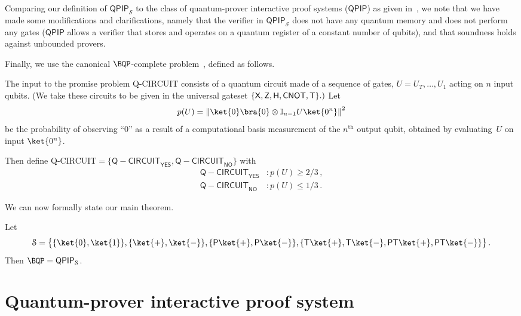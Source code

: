 \documentclass{toc}
\newcommand{\hgate}{{\sf H}}
\newcommand{\pgate}{{\sf P}}
\newcommand{\tgate}{{\sf T}}
\newcommand{\xgate}{{\sf X}}
\newcommand{\zgate}{{\sf Z}}
\newcommand{\cnot}{{\sf CNOT}}
\newcommand{\QPIP}{\mathsf{QPIP}}
\newcommand{\calS}{\mathcal{S}}
\newcommand{\norm}[1]{\left\lVert#1\right\rVert}					%
\begin{document}
Comparing our definition of $\QPIP_\calS$ to the class of quantum-prover interactive proof systems ($\QPIP$) as given in~\cite{ABE10}, we note that we have made some modifications and clarifications, namely that the verifier in $\QPIP_\calS$ does not have any quantum memory and does not perform any gates ($\QPIP$ allows a verifier that stores and operates on a quantum register of a constant number of qubits), and that soundness holds against unbounded provers.




Finally, we use the %
%
%
%
canonical $\BQP$-complete problem~\cite{ABE10},  %
defined as follows.    %
\begin{definition} \label{defn-Q-circuit}
%
%
The input to the promise problem \textsf{Q-CIRCUIT} consists 
of a quantum circuit made of a sequence of gates, $U= U_T, \ldots, U_1$ acting on $n$ input
%
%
qubits.  (We take
these circuits to be given in the universal gateset $\{\xgate, \zgate, \hgate,
%
\cnot, \tgate\}.)$   %
Let
  \begin{equation}
    p(U)= \norm{\ket{0}\bra{0}\otimes \mathbb{I}_{n-1} U \ket{0^n}}^2
  \end{equation}
  be the probability of observing ``0'' as a result of a computational
  basis measurement of the $n^{\text{th}}$ output qubit, obtained by
  evaluating~$U$ on input $\ket{0^n}$.

Then define Q-CIRCUIT$=\{\mathsf{Q-CIRCUIT}_\mathsf{YES}, \mathsf{Q-CIRCUIT}_\mathsf{NO}\}$ with %
\begin{align}
\mathsf{Q-CIRCUIT}_\mathsf{YES} &:  p(U)  \geq 2/3\,, \\
\mathsf{Q-CIRCUIT}_\mathsf{NO} &:  p(U)  \leq 1/3\,.
\end{align}
\end{definition}
We can now formally state our main theorem.
\begin{theorem}
\label{thm:main-QPIP}
Let
\begin{equation}
  \mathcal{S} = \bigl\{ \{\ket{0}, \ket{1}\}, \{\ket{+}, \ket{-}\}, \{\pgate\ket{+}, \pgate\ket{-}\},
  \{\tgate\ket{+}, \tgate\ket{-}, \pgate\tgate\ket{+}, \pgate\tgate\ket{-}\}\bigr\}\,.
\end{equation}
Then $\BQP = \QPIP_\calS$.
\end{theorem}





\section{Quantum-prover interactive proof system}
\label{sec:Interactive-Proof-aux}
\end{document}
